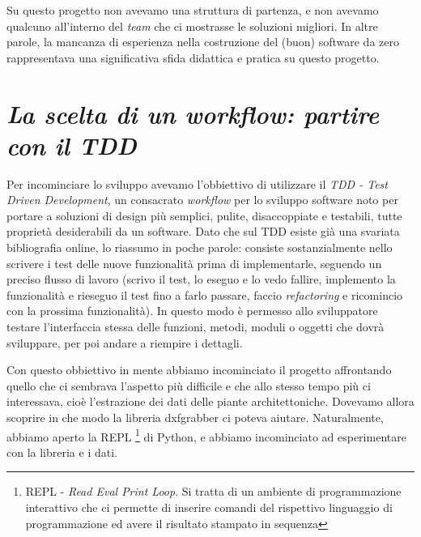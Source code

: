 \documentclass[12pt]{report}
\begin{document}
Su questo progetto non avevamo una struttura di partenza, e non avevamo qualcuno all'interno del \textit{team} che ci mostrasse le soluzioni migliori. In altre parole, la mancanza di esperienza nella costruzione del (buon) software da zero rappresentava una significativa sfida didattica e pratica su questo progetto.

\section{\textit{La scelta di un workflow: partire con il TDD}}

Per incominciare lo sviluppo avevamo l'obbiettivo di utilizzare il \textit{TDD - Test Driven Development}, un consacrato \textit{workflow} per lo sviluppo software noto per portare a soluzioni di design più semplici, pulite, disaccoppiate e testabili, tutte proprietà desiderabili da un software. Dato che sul TDD esiste già una svariata bibliografia online, lo riassumo in poche parole: consiste sostanzialmente nello scrivere i test delle nuove funzionalità prima di implementarle, seguendo un preciso flusso di lavoro (scrivo il test, lo eseguo e lo vedo fallire, implemento la funzionalità e rieseguo il test fino a farlo passare, faccio \textit{refactoring} e ricomincio con la prossima funzionalità). In questo modo è permesso allo sviluppatore testare l'interfaccia stessa delle funzioni, metodi, moduli o oggetti che dovrà sviluppare, per poi andare a riempire i dettagli.

Con questo obbiettivo in mente abbiamo incominciato il progetto affrontando quello che ci sembrava l'aspetto più difficile e che allo stesso tempo più ci interessava, cioè l'estrazione dei dati delle piante architettoniche. Dovevamo allora scoprire in che modo la libreria dxfgrabber ci poteva aiutare. Naturalmente, abbiamo aperto la REPL
\footnote{
  REPL - \textit{Read Eval Print Loop}. Si tratta di un ambiente di programmazione interattivo che ci permette di inserire comandi del rispettivo linguaggio di programmazione ed avere il risultato stampato in sequenza 
} 
di Python, e abbiamo incominciato ad esperimentare con la libreria e i dati.
\end{document}
